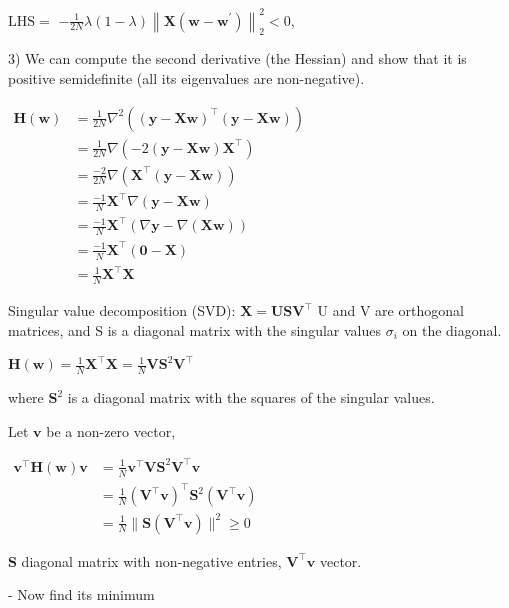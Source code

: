 $\mathrm{LHS}=$
$-\frac{1}{2 N} \lambda(1-\lambda)\left\|\mathbf{X}\left(\mathbf{w}-\mathbf{w}^{\prime}\right)\right\|_{2}^{2} < 0$,


3) We can compute the second derivative (the Hessian) and show that it is positive semidefinite (all its eigenvalues are non-negative). 

$\begin{aligned}
    \mathbf{H}(\mathbf{w})& =\frac{1}{2N}\nabla^2\left(\left(\mathbf{y}-\mathbf{X}\mathbf{w}\right)^\top\left(\mathbf{y}-\mathbf{X}\mathbf{w}\right)\right)  \\
    &=\frac{1}{2N}\nabla\left(-2(\mathbf{y}-\mathbf{X}\mathbf{w})\mathbf{X}^\top\right) \\
    &=\frac{-2}{2N}\nabla(\mathbf{X}^\top(\mathbf{y}-\mathbf{X}\mathbf{w})) \\
    &=\frac{-1}N\mathbf{X}^\top\nabla(\mathbf{y}-\mathbf{X}\mathbf{w}) \\
    &=\frac{-1}N\mathbf{X}^\top(\nabla\mathbf{y}-\nabla(\mathbf{X}\mathbf{w})) \\
    &=\frac{-1}N\mathbf{X}^\top(\mathbf{0}-\mathbf{X}) \\
    &=\frac1N\mathbf{X}^\top\mathbf{X}
\end{aligned}$

Singular value decomposition (SVD):
$
\mathbf{X}=\mathbf{US}\mathbf{V}^\top 
$
U and V are orthogonal matrices, and S is a diagonal matrix with the singular values $\sigma_i$ on the diagonal.

$
\mathbf{H}(\mathbf{w})=\frac1N\mathbf{X}^\top\mathbf{X}=\frac1N\mathbf{V}\mathbf{S}^2\mathbf{V}^\top 
$

where $\mathbf{S}^2$ is a diagonal matrix with the squares of the singular values. 

Let $\mathbf{v}$ be a non-zero vector,

$
\begin{aligned}
\mathbf{v}^\top\mathbf{H}(\mathbf{w})\mathbf{v}& =\frac1N\mathbf{v}^\top\mathbf{V}\mathbf{S}^2\mathbf{V}^\top\mathbf{v} \\
&=\frac1N(\mathbf{V}^\top\mathbf{v})^\top\mathbf{S}^2(\mathbf{V}^\top\mathbf{v}) \\
&=\frac1N\|\mathbf{S}(\mathbf{V}^\top\mathbf{v})\|^2 \geq 0
\end{aligned}
$

$\mathbf{S}$ diagonal matrix with non-negative entries, $\mathbf{V}^\top\mathbf{v}$ vector.


- Now find its minimum

